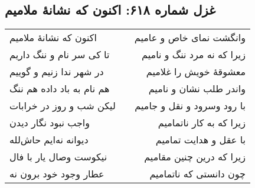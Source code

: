 \begin{center}
\section*{غزل شماره ۶۱۸: اکنون که نشانهٔ ملامیم}
\label{sec:618}
\begin{longtable}{l p{0.5cm} r}
اکنون که نشانهٔ ملامیم
&&
وانگشت نمای خاص و عامیم
\\
تا کی سر نام و ننگ داریم
&&
زیرا که نه مرد ننگ و نامیم
\\
در شهر ندا زنیم و گوییم
&&
معشوقهٔ خویش را غلامیم
\\
هم نام به باد داده هم ننگ
&&
واندر طلب نشان و نامیم
\\
لیکن شب و روز در خرابات
&&
با رود وسرود و نقل و جامیم
\\
واجب نبود نگار دیدن
&&
زیرا که به کار ناتمامیم
\\
دیوانه نه‌ایم حاش‌لله
&&
با عقل و هدایت تمامیم
\\
نیکوست وصال یار با فال
&&
زیرا که درین چنین مقامیم
\\
عطار وجود خود برون نه
&&
چون دانستی که ناتمامیم
\\
\end{longtable}
\end{center}
